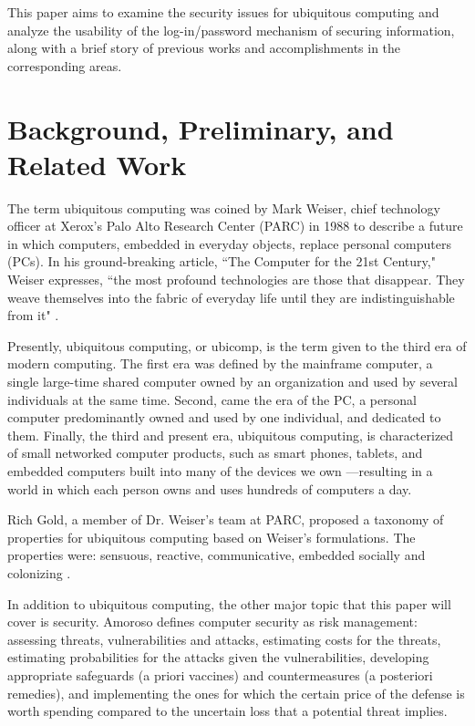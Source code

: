 \documentclass{article}
\begin{document}
This paper aims to examine the security issues for ubiquitous computing and analyze the usability of the log-in/password mechanism of securing information, along with a brief story of previous works and accomplishments in the corresponding areas. 

\section{Background, Preliminary, and Related Work}
The term ubiquitous computing was coined by Mark Weiser, chief technology officer at Xerox’s Palo Alto Research Center (PARC) in 1988 to describe a future in which computers, embedded in everyday objects, replace personal computers (PCs). In his ground-breaking article, ``The Computer for the 21st Century," Weiser expresses, ``the most profound technologies are those that disappear. They weave themselves into the fabric of everyday life until they are indistinguishable from it" \cite{weiser1991computer}.

Presently, ubiquitous computing, or ubicomp, is the term given to the third era of modern computing. The first era was defined by the mainframe computer, a single large-time shared computer owned by an organization and used by several individuals at the same time. Second, came the era of the PC, a personal computer predominantly owned and used by one individual, and dedicated to them. Finally, the third and present era, ubiquitous computing, is characterized of small networked computer products, such as smart phones, tablets, and embedded computers built into many of the devices we own ---resulting in a world in which each person owns and uses hundreds of computers a day.

Rich Gold, a member of Dr. Weiser’s team at PARC, proposed a taxonomy of properties for ubiquitous computing based on Weiser’s formulations. The properties were: sensuous, reactive, communicative, embedded socially and colonizing \cite{gold2007plenitude}. 

In addition to ubiquitous computing, the other major topic that this paper will cover is security. Amoroso\cite{amoroso1994fundamentals} defines computer security as risk management: assessing threats, vulnerabilities and attacks, estimating costs for the threats, estimating probabilities for the attacks given the vulnerabilities, developing appropriate safeguards (a priori vaccines) and countermeasures (a posteriori remedies), and implementing the ones for which the certain price of the defense is worth spending compared to the uncertain loss that a potential threat implies. 
\end{document}
